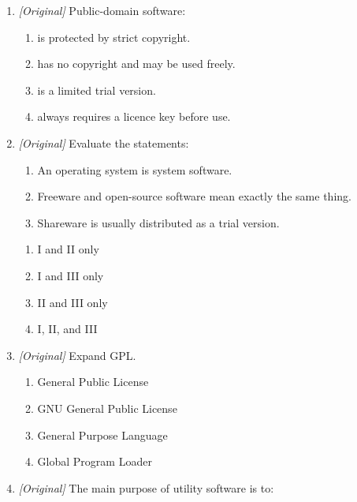 \begin{enumerate}[label=\textbf{Q\arabic*.}, leftmargin=*]
\begin{enumerate}[label=\Alph*.]
    \item is fully free and provides its source code.
    \item is offered as a limited trial and requires payment for continued or
      full use.
    \item forms part of the operating system.
    \item is exactly the same as public-domain software.
  \end{enumerate}
\item \textit{[Original]} Public-domain software:
  \begin{enumerate}[label=\Alph*.]
    \item is protected by strict copyright.
    \item has no copyright and may be used freely.
    \item is a limited trial version.
    \item always requires a licence key before use.
  \end{enumerate}
\item \textit{[Original]} Evaluate the statements:
  \begin{enumerate}[label=\Roman*.]
    \item An operating system is system software.
    \item Freeware and open-source software mean exactly the same thing.
    \item Shareware is usually distributed as a trial version.
  \end{enumerate}
  \begin{enumerate}[label=\Alph*.]
    \item I and II only
    \item I and III only
    \item II and III only
    \item I, II, and III
  \end{enumerate}
\item \textit{[Original]} Expand GPL.
  \begin{enumerate}[label=\Alph*.]
    \item General Public License
    \item GNU General Public License
    \item General Purpose Language
    \item Global Program Loader
  \end{enumerate}
\item \textit{[Original]} The main purpose of utility software is to:
  \begin{enumerate}[label=\Alph*.]

\end{enumerate}
\end{enumerate}
